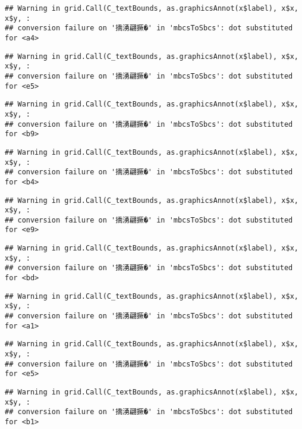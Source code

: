 \documentclass[
]{article}
\begin{document}
\begin{verbatim}
## Warning in grid.Call(C_textBounds, as.graphicsAnnot(x$label), x$x, x$y, :
## conversion failure on '撟湧翩撅�' in 'mbcsToSbcs': dot substituted for <a4>
\end{verbatim}

\begin{verbatim}
## Warning in grid.Call(C_textBounds, as.graphicsAnnot(x$label), x$x, x$y, :
## conversion failure on '撟湧翩撅�' in 'mbcsToSbcs': dot substituted for <e5>
\end{verbatim}

\begin{verbatim}
## Warning in grid.Call(C_textBounds, as.graphicsAnnot(x$label), x$x, x$y, :
## conversion failure on '撟湧翩撅�' in 'mbcsToSbcs': dot substituted for <b9>
\end{verbatim}

\begin{verbatim}
## Warning in grid.Call(C_textBounds, as.graphicsAnnot(x$label), x$x, x$y, :
## conversion failure on '撟湧翩撅�' in 'mbcsToSbcs': dot substituted for <b4>
\end{verbatim}

\begin{verbatim}
## Warning in grid.Call(C_textBounds, as.graphicsAnnot(x$label), x$x, x$y, :
## conversion failure on '撟湧翩撅�' in 'mbcsToSbcs': dot substituted for <e9>
\end{verbatim}

\begin{verbatim}
## Warning in grid.Call(C_textBounds, as.graphicsAnnot(x$label), x$x, x$y, :
## conversion failure on '撟湧翩撅�' in 'mbcsToSbcs': dot substituted for <bd>
\end{verbatim}

\begin{verbatim}
## Warning in grid.Call(C_textBounds, as.graphicsAnnot(x$label), x$x, x$y, :
## conversion failure on '撟湧翩撅�' in 'mbcsToSbcs': dot substituted for <a1>
\end{verbatim}

\begin{verbatim}
## Warning in grid.Call(C_textBounds, as.graphicsAnnot(x$label), x$x, x$y, :
## conversion failure on '撟湧翩撅�' in 'mbcsToSbcs': dot substituted for <e5>
\end{verbatim}

\begin{verbatim}
## Warning in grid.Call(C_textBounds, as.graphicsAnnot(x$label), x$x, x$y, :
## conversion failure on '撟湧翩撅�' in 'mbcsToSbcs': dot substituted for <b1>
\end{verbatim}
\end{document}
